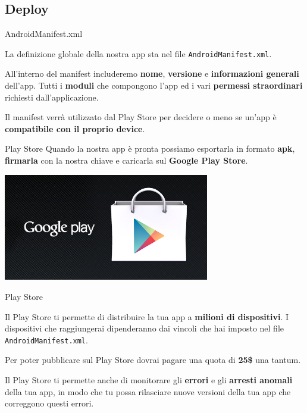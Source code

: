 \documentclass[xcolor=svgnames,11pt]{beamer}
\begin{document}
\subsection{Deploy}
\begin{frame}{AndroidManifest.xml}

La definizione globale della nostra app sta nel file \texttt{AndroidManifest.xml}.

\medskip
\pause

All'interno del manifest includeremo \textbf{nome}, \textbf{versione} e \textbf{informazioni generali} dell'app. Tutti i \textbf{moduli} che compongono l'app ed i vari \textbf{permessi straordinari} richiesti dall'applicazione.

\medskip
\pause

\begin{block}{}
Il manifest verr\`a utilizzato dal Play Store per decidere o meno se un'app \`e \textbf{compatibile con il proprio device}.
\end{block}
\end{frame}

\begin{frame}{Play Store}
Quando la nostra app \`e pronta possiamo esportarla in formato \textbf{apk}, \textbf{firmarla} con la nostra chiave e caricarla sul \textbf{Google Play Store}.

\begin{center}
\includegraphics[width=9cm]{playstore.png}
\end{center}
\end{frame}

\begin{frame}{Play Store}

Il Play Store ti permette di distribuire la tua app a \textbf{milioni di dispositivi}. I dispositivi che raggiungerai dipenderanno dai vincoli che hai imposto nel file \texttt{AndroidManifest.xml}.

\medskip
\pause

\begin{block}{}
Per poter pubblicare sul Play Store dovrai pagare una quota di \textbf{25\$} una tantum.
\end{block}

\medskip
\pause

Il Play Store ti permette anche di monitorare gli \textbf{errori} e gli \textbf{arresti anomali} della tua app, in modo che tu possa rilasciare nuove versioni della tua app che correggono questi errori.
\end{frame}
\end{document}
